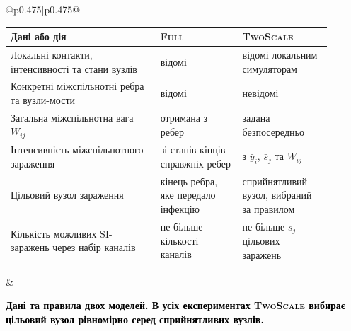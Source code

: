 ﻿\documentclass[11pt]{article}
\newcommand{\ibar}{\bar{y}}
\newcommand{\sbar}{\bar{s}}
\newcommand{\Full}{\textup{\textsc{Full}}}
\newcommand{\TS}{\textup{\textsc{TwoScale}}}
\begin{document}
\begin{longtable}{@{}p{0.475\textwidth}|p{0.475\textwidth}@{}}
\begin{minipage}[t]{\linewidth}
\begin{minipage}{\linewidth}
\small
\setlength{\tabcolsep}{3pt}\begin{tabular}{>{\raggedright\arraybackslash}p{0.42\linewidth}>{\raggedright\arraybackslash}p{0.23\linewidth}>{\raggedright\arraybackslash}p{0.25\linewidth}}
\toprule
Дані або дія & \Full{} & \TS{}\\
\midrule
Локальні контакти, інтенсивності та стани вузлів & відомі & відомі локальним симуляторам\\
Конкретні міжспільнотні ребра та вузли-мости & відомі & невідомі\\
Загальна міжспільнотна вага $W_{ij}$ & отримана з ребер & задана безпосередньо\\
Інтенсивність міжспільнотного зараження & зі станів кінців справжніх ребер & з $\ibar_i$, $\sbar_j$ та $W_{ij}$\\
Цільовий вузол зараження & кінець ребра, яке передало інфекцію & сприйнятливий вузол, вибраний за правилом\\
Кількість можливих SI-заражень через набір каналів & не більше кількості каналів & не більше $s_j$ цільових заражень\\
\bottomrule
\end{tabular}
\end{minipage}\par
\end{minipage} &
\begin{minipage}[t]{\linewidth}
\par\noindent\begin{minipage}{\linewidth}
\color{black}\centering
\par\small\textbf{\textcolor{black}{Дані та правила двох моделей. В усіх експериментах \TS{} вибирає цільовий вузол рівномірно серед сприйнятливих вузлів.}}


\end{minipage}
\end{minipage}
\end{longtable}
\end{document}
